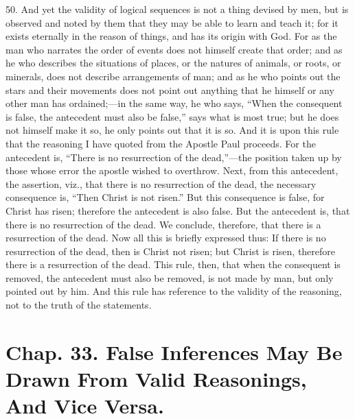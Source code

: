 50. And yet the validity of logical sequences is not a thing devised
by men, but is observed and noted by them that they may be able to
learn and teach it; for it exists eternally in the reason of things,
and has its origin with God. For as the man who narrates the order of
events does not himself create that order; and as he who describes the
situations of places, or the natures of animals, or roots, or
minerals, does not describe arrangements of man; and as he who points
out the stars and their movements does not point out anything that he
himself or any other man has ordained;---in the same way, he who says,
``When the consequent is false, the antecedent must also be false,''
says what is most true; but he does not himself make it so, he only
points out that it is so. And it is upon this rule that the reasoning
I have quoted from the Apostle Paul proceeds. For the antecedent is,
``There is no resurrection of the dead,''---the position taken up by
those whose error the apostle wished to overthrow. Next, from this
antecedent, the assertion, viz., that there is no resurrection of the
dead, the necessary consequence is, ``Then Christ is not risen.'' But
this consequence is false, for Christ has risen; therefore the
antecedent is also false. But the antecedent is, that there is no
resurrection of the dead. We conclude, therefore, that there is a
resurrection of the dead. Now all this is briefly expressed thus: If
there is no resurrection of the dead, then is Christ not risen; but
Christ is risen, therefore there is a resurrection of the dead. This
rule, then, that when the consequent is removed, the antecedent must
also be removed, is not made by man, but only pointed out by him. And
this rule has reference to the validity of the reasoning, not to the
truth of the statements.

\section{Chap. 33. False Inferences May Be Drawn From Valid
Reasonings, And Vice Versa.}

